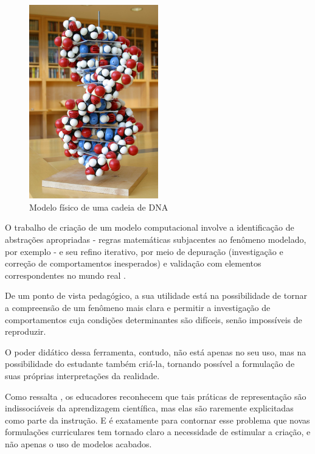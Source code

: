 \begin{figure}[!htb]
  \caption{Modelo físico de uma cadeia de DNA}
	\begin{center}
    \includegraphics[width=0.5\textwidth]{imagens/modelo_fisico.jpg}
	\end{center}
	\label{fig:modelo-fisico}
\end{figure}

O trabalho de criação de um modelo computacional involve a identificação de abstrações apropriadas - regras matemáticas subjacentes ao fenômeno modelado, por exemplo - e seu refino iterativo, por meio de depuração (investigação e correção de comportamentos inesperados) e validação com elementos correspondentes no mundo real \cite{wing2008}.

De um ponto de vista pedagógico, a sua utilidade está na possibilidade de tornar a compreensão de um fenômeno mais clara e permitir a investigação de comportamentos cuja condições determinantes são difíceis, senão impossíveis de reproduzir.

O poder didático dessa ferramenta, contudo, não está apenas no seu uso, mas na possibilidade do estudante também criá-la, tornando possível a formulação de suas próprias interpretações da realidade. 

Como ressalta , os educadores reconhecem que tais práticas de representação são indissociáveis da aprendizagem científica, mas elas são raremente explicitadas como parte da instrução. E é exatamente para contornar esse problema que novas formulações curriculares tem tornado claro a necessidade de estimular a criação, e não apenas o uso de modelos acabados. 


